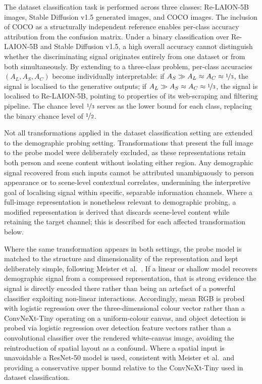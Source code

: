 The dataset classification task is performed across three classes: Re-LAION-5B images, Stable Diffusion v1.5 generated images, and COCO images. The inclusion of COCO as a structurally independent reference enables per-class accuracy attribution from the confusion matrix. Under a binary classification over Re-LAION-5B and Stable Diffusion v1.5, a high overall accuracy cannot distinguish whether the discriminating signal originates entirely from one dataset or from both simultaneously. By extending to a three-class problem, per-class accuracies $(A_L, A_S, A_C)$ become individually interpretable: if $A_S \gg A_L \approx A_C \approx \nicefrac{1}{3}$, the signal is localised to the generative outputs; if $A_L \gg A_S \approx A_C \approx \nicefrac{1}{3}$, the signal is localised to Re-LAION-5B, pointing to properties of its web-scraping and filtering pipeline. The chance level $\nicefrac{1}{3}$ serves as the lower bound for each class, replacing the binary chance level of $\nicefrac{1}{2}$.

Not all transformations applied in the dataset classification setting are extended to the demographic probing setting. Transformations that present the full image to the probe model were deliberately excluded, as these representations retain both person and scene content without isolating either region. Any demographic signal recovered from such inputs cannot be attributed unambiguously to person appearance or to scene-level contextual correlates, undermining the interpretive goal of localising signal within specific, separable information channels. Where a full-image representation is nonetheless relevant to demographic probing, a modified representation is derived that discards scene-level content while retaining the target channel; this is described for each affected transformation below.

Where the same transformation appears in both settings, the probe model is matched to the structure and dimensionality of the representation and kept deliberately simple, following Meister et al.~\cite{Meister_2023_GenderArtifactsinVisualDatasets}. If a linear or shallow model recovers demographic signal from a compressed representation, that is strong evidence the signal is directly encoded there rather than being an artefact of a powerful classifier exploiting non-linear interactions. Accordingly, mean RGB is probed with logistic regression over the three-dimensional colour vector rather than a ConvNeXt-Tiny operating on a uniform-colour canvas, and object detection is probed via logistic regression over detection feature vectors rather than a convolutional classifier over the rendered white-canvas image, avoiding the reintroduction of spatial layout as a confound. Where a spatial input is unavoidable a ResNet-50 model is used, consistent with Meister et al.\ and providing a conservative upper bound relative to the ConvNeXt-Tiny used in dataset classification.

